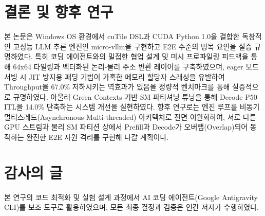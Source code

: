 \documentclass[preprint]{kcc} %
\begin{document}
\begin{table}[h]
\centering
\caption{Qwen2.5-3B-Instruct 기반 Baseline vs Green Contexts 성능 비교}
\end{table}


\section{결론 및 향후 연구}
본 논문은 Windows OS 환경에서 cuTile DSL과 CUDA Python 1.0을 결합한 독창적인 고성능 LLM 추론 엔진인 micro-vllm을 구현하고 E2E 수준의 병목 요인을 실증 규명하였다. 특히 코딩 에이전트와의 밀접한 협업 설계 및 미시 프로파일링 피드백을 통해 64x64 타일링과 벡터화된 논리-물리 주소 변환 레이어를 구축하였으며, eager 모드 서빙 시 JIT 방지용 패딩 기법이 가혹한 메모리 할당자 스래싱을 유발하여 Throughput을 67.0\% 저하시키는 역효과가 있음을 정량적 벤치마크를 통해 실증적으로 규명하였다. 아울러 Green Contexts 기반 SM 파티셔닝 튜닝을 통해 Decode P50 ITL을 14.0\% 단축하는 시스템 개선을 실현하였다.
향후 연구로는 엔진 루프를 비동기 멀티스레드(Asynchronous Multi-threaded) 아키텍처로 전면 이원화하여, 서로 다른 GPU 스트림과 물리 SM 파티션 상에서 Prefill과 Decode가 오버랩(Overlap)되어 동작하는 완전한 E2E 자원 격리를 구현해 나갈 계획이다.

\section*{감사의 글}
본 연구의 코드 최적화 및 실험 설계 과정에서 AI 코딩 에이전트(Google Antigravity CLI)를 보조 도구로 활용하였으며, 모든 최종 결정과 검증은 인간 저자가 수행하였다.

%
%
\end{document}
